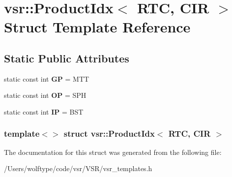 \hypertarget{structvsr_1_1_product_idx_3_01_r_t_c_00_01_c_i_r_01_4}{\section{vsr\-:\-:Product\-Idx$<$ R\-T\-C, C\-I\-R $>$ Struct Template Reference}
\label{structvsr_1_1_product_idx_3_01_r_t_c_00_01_c_i_r_01_4}
}
\subsection*{Static Public Attributes}
\begin{DoxyCompactItemize}
\item 
\hypertarget{structvsr_1_1_product_idx_3_01_r_t_c_00_01_c_i_r_01_4_aa8f8fece0324a01a8bd7672daae193ed}{static const int {\bfseries G\-P} = M\-T\-T}\label{structvsr_1_1_product_idx_3_01_r_t_c_00_01_c_i_r_01_4_aa8f8fece0324a01a8bd7672daae193ed}

\item 
\hypertarget{structvsr_1_1_product_idx_3_01_r_t_c_00_01_c_i_r_01_4_adb16c0161d7f3efa49745abb804417fa}{static const int {\bfseries O\-P} = S\-P\-H}\label{structvsr_1_1_product_idx_3_01_r_t_c_00_01_c_i_r_01_4_adb16c0161d7f3efa49745abb804417fa}

\item 
\hypertarget{structvsr_1_1_product_idx_3_01_r_t_c_00_01_c_i_r_01_4_a814e933c87912020ef98101cd55ef5c8}{static const int {\bfseries I\-P} = B\-S\-T}\label{structvsr_1_1_product_idx_3_01_r_t_c_00_01_c_i_r_01_4_a814e933c87912020ef98101cd55ef5c8}

\end{DoxyCompactItemize}
\subsubsection*{template$<$$>$ struct vsr\-::\-Product\-Idx$<$ R\-T\-C, C\-I\-R $>$}



The documentation for this struct was generated from the following file\-:\begin{DoxyCompactItemize}
\item 
/\-Users/wolftype/code/vsr/\-V\-S\-R/vsr\-\_\-templates.\-h\end{DoxyCompactItemize}
